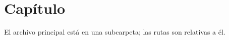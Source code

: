 \documentclass{report}
\begin{document}
\chapter{Capítulo}
El archivo principal está en una subcarpeta; las rutas son relativas a él.

\end{document}
